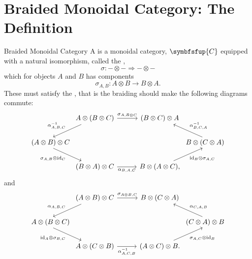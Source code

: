 \documentclass[fleqn]{NotesClass}
\newcommand{\cat}[1]{\symbfsfup{#1}}
\DeclareMathOperator{\id}{id}
\newcommand{\naturalTransformation}{\Rightarrow}
\begin{document}
    \section{Braided Monoidal Category: The Definition}
    \begin{dfn}{Braided Monoidal Category}{}
        A  is a monoidal category, \(\cat{C}\) equipped with a natural isomorphism, called the ,
        \begin{equation}
            \sigma \colon -\otimes- \naturalTransformation -\otimes-
        \end{equation}
        which for objects \(A\) and \(B\) has components
        \begin{equation}
            \sigma_{A,B} \colon A \otimes B \to B \otimes A.
        \end{equation}
        These must satisfy the , that is the braiding should make the following diagrams commute:
        \begin{equation}
            \begin{tikzcd}[column sep=1cm]
                & A \otimes (B \otimes C) \arrow[r, "\sigma_{A,B\otimes C}"] \arrow[dl, "\alpha_{A,B,C}^{-1}"'] & (B \otimes C) \otimes A & \\
                (A \otimes B) \otimes C \arrow[dr, "\sigma_{A,B} \otimes \id_C"'] \hspace{-1cm} &&& \hspace{-1cm} B \otimes (C \otimes A) \arrow[ul, "\alpha_{B,C,A}^{-1}"']\\
                & (B \otimes A) \otimes C \arrow[r, "\alpha_{B,A,C}"'] & B \otimes (A \otimes C), \arrow[ur, "{\id_B} \otimes \sigma_{A,C}"']
            \end{tikzcd}
        \end{equation}
        and
        \begin{equation}
            \begin{tikzcd}[column sep=1cm]
                & (A \otimes B) \otimes C \arrow[r, "\sigma_{A\otimes B,C}"] \arrow[dl, "\alpha_{A,B,C}"'] & B \otimes (C \otimes A) & \\
                A \otimes (B \otimes C) \arrow[dr, "{\id_A} \otimes \sigma_{B,C}"'] \hspace{-1cm} &&& \hspace{-1cm} (C \otimes A) \otimes B \arrow[ul, "\alpha_{C,A,B}"']\\
                & A \otimes (C \otimes B) \arrow[r, "\alpha_{A,C,B}^{-1}"'] & (A \otimes C) \otimes B. \arrow[ur, "\sigma_{A,C} \otimes \id_B"']
            \end{tikzcd}
        \end{equation}
    \end{dfn}
    
\end{document}
